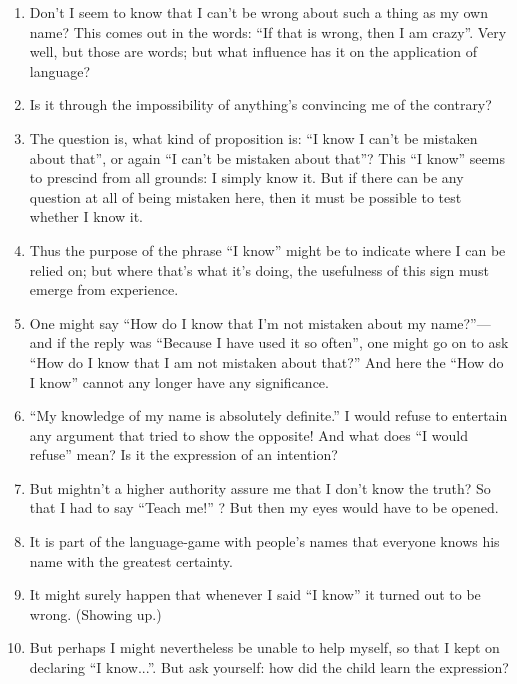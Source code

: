 \documentclass{book}
\begin{document}
\begin{enumerate}
\item
Don't I seem to know that I can't be wrong about such a thing as my own name?
This comes out in the words: ``If that is wrong, then I am crazy''. Very well,
but those are words; but what influence has it on the application of language?

\item
Is it through the impossibility of anything's convincing me of the contrary?

\item
The question is, what kind of proposition is: ``I know I can't be mistaken
about that'', or again ``I can't be mistaken about that''?  This ``I know''
seems to prescind from all grounds: I simply know it. But if there can be any
question at all of being mistaken here, then it must be possible to test
whether I know it.

\item
Thus the purpose of the phrase ``I know'' might be to indicate where I can be
relied on; but where that's what it's doing, the usefulness of this sign must
emerge from experience.

\item
One might say ``How do I know that I'm not mistaken about my name?''---and if
the reply was ``Because I have used it so often'', one might go on to ask ``How
do I know that I am not mistaken about that?'' And here the ``How do I know''
cannot any longer have any significance.

\item
``My knowledge of my name is absolutely definite.'' I would refuse to entertain
any argument that tried to show the opposite!  And what does ``I would refuse''
mean? Is it the expression of an intention?

\item
But mightn't a higher authority assure me that I don't know the truth? So that
I had to say ``Teach me!'' ? But then my eyes would have to be opened.

\item
It is part of the language-game with people's names that everyone knows his
name with the greatest certainty.

\item
It might surely happen that whenever I said ``I know'' it turned out to be
wrong. (Showing up.)

\item
But perhaps I might nevertheless be unable to help myself, so that I kept on
declaring ``I know...''. But ask yourself: how did the child learn the
expression?


\end{enumerate}
\end{document}
